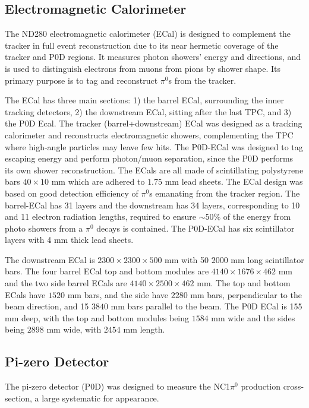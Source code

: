 \subsection{Electromagnetic Calorimeter}
The ND280 electromagnetic calorimeter (ECal)\cite{t2k_ecal} is designed to complement the tracker in full event reconstruction due to its near hermetic coverage of the tracker and P0D regions. It measures photon showers' energy and directions, and is used to distinguish electrons from muons from pions by shower shape. Its primary purpose is to tag and reconstruct $\pi^0$s from the tracker.

The ECal has three main sections: 1) the barrel ECal, surrounding the inner tracking detectors, 2) the downstream ECal, sitting after the last TPC, and 3) the P0D Ecal. The tracker (barrel+downstream) ECal was designed as a tracking calorimeter and reconstructs electromagnetic showers, complementing the TPC where high-angle particles may leave few hits. The P0D-ECal was designed to tag escaping energy and perform photon/muon separation, since the P0D performs its own shower reconstruction. The ECals are all made of scintillating polystyrene bars $40\times10\text{ mm}$ which are adhered to $1.75\text{ mm}$ lead sheets. The ECal design was based on good detection efficiency of $\pi^0$s emanating from the tracker region. The barrel-ECal has 31 layers and the downstream has 34 layers, corresponding to 10 and 11 electron radiation lengths, required to ensure $\sim50\%$ of the energy from photo showers from a $\pi^0$ decays is contained. The P0D-ECal has six scintillator layers with 4 mm thick lead sheets.

The downstream ECal is $2300\times2300\times500\text{ mm}$ with 50 $2000\text{ mm}$ long scintillator bars. The four barrel ECal top and bottom modules are $4140\times1676\times462\text{ mm}$ and the two side barrel ECals are $4140\times2500\times462\text{ mm}$. The top and bottom ECals have $1520\text{ mm}$ bars, and the side have $2280\text{ mm}$ bars, perpendicular to the beam direction, and 15 $3840\text{ mm}$ bars parallel to the beam. The P0D ECal is 155 mm deep, with the top and bottom modules being $1584\text{ mm}$ wide and the sides being $2898\text{ mm}$ wide, with $2454\text{ mm}$ length.

\subsection{Pi-zero Detector}
The pi-zero detector (P0D)\cite{t2k_p0d} was designed to measure the NC1$\pi^0$ production cross-section, a large systematic for \nue appearance.

